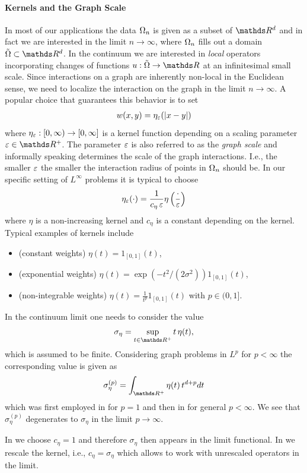 \paragraph{Kernels and the Graph Scale} 
In most of our applications the data $\Omega_n$ is given as a subset of $\R^d$ and in fact we are interested in the limit $n\to\infty$, where $\Omega_n$ fills out a domain $\tilde\domain\subset\R^d$. In the continuum we are interested in \emph{local} operators incorporating changes of functions $u:\tilde\domain\to\R$ at an infinitesimal small scale. Since interactions on a graph are inherently non-local in the Euclidean sense, we need to localize the interaction on the graph in the limit $n\to\infty$. A popular choice that guarantees this behavior is to set
%
\begin{align*}
w(x,y) = \eta_{\varepsilon}(\left|x-y\right|)
\end{align*}
%
where $\eta_\varepsilon:[0,\infty)\to [0,\infty]$ is a kernel function depending on a scaling parameter $\gscale\in\R^+$. The parameter $\varepsilon$ is also referred to as the \emph{graph scale} and informally speaking determines the scale of the graph interactions. I.e., the smaller $\varepsilon$ the smaller the interaction radius of points in $\Omega_n$ should be. In our specific setting of $L^\infty$ problems it is typical to choose
%
\begin{align*}
\eta_\varepsilon(\cdot) = \frac{1}{c_\eta\, \varepsilon} \eta\left(\frac{\cdot}{\varepsilon}\right)
\end{align*}
%
where $\eta$ is a non-increasing kernel and $c_\eta$ is a constant depending on the kernel. Typical examples of kernels include
%
\begin{itemize}
\item (constant weights) $\eta(t)=1_{[0,1]}(t)$,
\item (exponential weights) $\eta(t)=\exp(-t^2/(2\sigma^2))1_{[0,1]}(t)$,
\item (non-integrable weights) $\eta(t)=\frac{1}{t^p}1_{[0,1]}(t)$ with $p\in(0,1]$.
\end{itemize}
%
%
\begin{remark}{}{}
In the continuum limit one needs to consider the value 
%
\begin{align*}
\sigma_\eta = \sup_{t\in\R^+} t\, \eta(t),
\end{align*}
%
which is assumed to be finite. Considering graph problems in $L^p$ for $p<\infty$
the corresponding value is given as
%
\begin{align}\label{eq:kernelconst}
\sigma_\eta^{(p)} = \int_{\R^+} \eta(t)\, t^{d+p} dt
\end{align}
%
which was first employed in \cite{GarcSlep15} for $p=1$ and then in \cite{slepcev2019analysis} for general $p<\infty$. We see that $\sigma_\eta^{(p)}$ degenerates to $\sigma_\eta$ in the limit $p\to\infty$.

In \cite{roith2022continuum} we choose $c_\eta=1$ and therefore $\sigma_\eta$ then appears in the limit functional. In \cite{bungert2021uniform} we rescale the kernel, i.e., $c_\eta = \sigma_\eta$ which allows to work with unrescaled operators in the limit. 
\end{remark}
